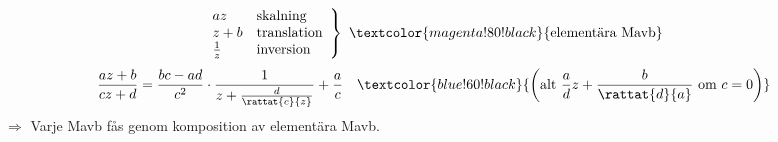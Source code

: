 \begin{example}
\[ \left.\begin{array}{ll} az & \text{skalning} \\ z + b & \text{translation} \\ \frac{1}{z} & \text{inversion} \end{array}\right\} \ \textcolor{magenta!80!black}{\text{elementära Mavb}} \]
\[ \frac{az + b}{cz + d} = \frac{bc - ad}{c^2} \cdot \frac{1}{z + \frac{d}{\rattat{c}{z}}} + \frac{a}{c} \quad \textcolor{blue!60!black}{\left(\text{alt } \frac{a}{d}z + \frac{b}{\rattat{d}{a}} \text{ om } c = 0\right)} \]
\textcolor{red!70!black}{$\Rightarrow$} Varje Mavb fås genom komposition av elementära Mavb.
\end{example}
